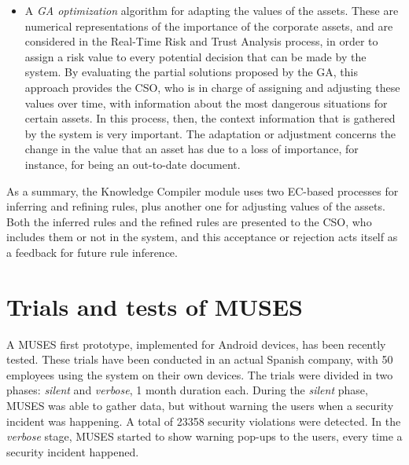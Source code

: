 \begin{itemize}
\item A \textit{GA optimization} algorithm for adapting the values of the assets. %
These are numerical representations of the importance of the corporate assets, and are considered in the Real-Time Risk and Trust Analysis process, in order to assign a risk value to every potential decision that can be made by the system.
By evaluating the partial solutions proposed by the GA, this approach provides the CSO, who is in charge of assigning and adjusting these values over time, with information about the most dangerous situations for certain assets. In this process, then, the context information that is gathered by the system is very important. %
The adaptation or adjustment concerns the change in the value that an asset has due to a loss of importance, for instance, for being an out-to-date document.

\end{itemize}


As a summary, the Knowledge Compiler module uses two EC-based processes for inferring and refining rules, plus another one for adjusting values of the assets.
 Both the inferred rules and the refined rules are presented to the CSO, who includes them or not in the system, and this acceptance or rejection acts itself as a feedback for future rule inference.



\section{Trials and tests of MUSES}
\label{subsec:trials}

A MUSES first prototype, implemented for Android devices, has been recently tested. These trials have been conducted in an actual Spanish company, with 50 employees using the system on their own devices.
The trials were divided in two phases: \textit{silent} and \textit{verbose}, 1 month duration each. During the \textit{silent} phase, MUSES was able to gather data, but without warning the users when a security incident was happening. A total of 23358 security violations were detected. In the \textit{verbose} stage, MUSES started to show warning pop-ups to the users, every time a security incident happened. 

